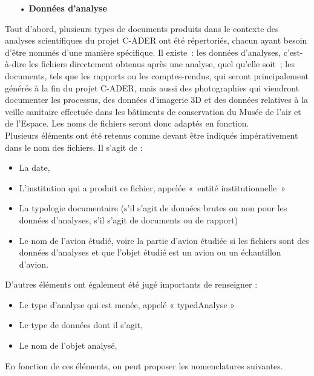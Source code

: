 \begin{itemize}
    \item[•] \textbf{Données d'analyse}
\end{itemize}

Tout d’abord, plusieurs types de documents produits dans le contexte des analyses scientifiques du projet C-ADER ont été répertoriés, chacun ayant besoin d’être nommés d’une manière spécifique. Il existe : les données d’analyses, c’est-à-dire les fichiers directement obtenus après une analyse, quel qu’elle soit ; les documents, tels que les rapports ou les comptes-rendus, qui seront principalement générés à la fin du projet C-ADER, mais aussi des photographies qui viendront documenter les processus, des données d’imagerie 3D et des données relatives à la veille sanitaire effectuée dans les bâtiments de conservation du Musée de l’air et de l’Espace. Les noms de fichiers seront donc adaptés en fonction.\\

Plusieurs éléments ont été retenus comme devant être indiqués impérativement dans le nom des fichiers. Il s’agit de :\\
\begin{itemize}
    \item La date, 
    \item L’institution qui a produit ce fichier, appelée « entité institutionnelle »
    \item La typologie documentaire (s’il s’agit de données brutes ou non pour les données d’analyses, s’il s’agit de documents ou de rapport)
    \item Le nom de l’avion étudié, voire la partie d’avion étudiée si les fichiers sont des données d’analyses et que l’objet étudié est un avion ou un échantillon d’avion.
\end{itemize}

D’autres éléments ont également été jugé importants de renseigner :\\
\begin{itemize}
    \item Le type d’analyse qui est menée, appelé « typedAnalyse »
    \item Le type de données dont il s’agit, 
    \item Le nom de l’objet analysé, 
\end{itemize}

En fonction de ces éléments, on peut proposer les nomenclatures suivantes.\\

